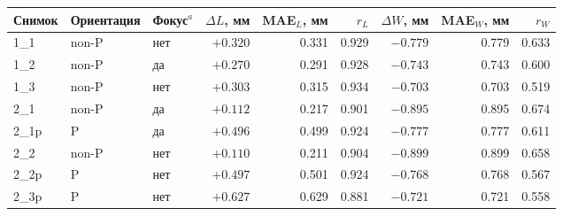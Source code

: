 \begin{tabular}{@{}lllrrrrrr@{}}
\toprule
Снимок & Ориентация & Фокус$^{a}$ & $\Delta L$, мм & MAE$_L$, мм & $r_L$ &
$\Delta W$, мм & MAE$_W$, мм & $r_W$ \\
\midrule
1\_1 & non-P & нет & $+\num{0.320}$ & \num{0.331} & \num{0.929} & $-\num{0.779}$ & \num{0.779} & \num{0.633} \\
1\_2 & non-P & да & $+\num{0.270}$ & \num{0.291} & \num{0.928} & $-\num{0.743}$ & \num{0.743} & \num{0.600} \\
1\_3 & non-P & нет & $+\num{0.303}$ & \num{0.315} & \num{0.934} & $-\num{0.703}$ & \num{0.703} & \num{0.519} \\
2\_1 & non-P & да & $+\num{0.112}$ & \num{0.217} & \num{0.901} & $-\num{0.895}$ & \num{0.895} & \num{0.674} \\
2\_1p & P & да & $+\num{0.496}$ & \num{0.499} & \num{0.924} & $-\num{0.777}$ & \num{0.777} & \num{0.611} \\
2\_2 & non-P & нет & $+\num{0.110}$ & \num{0.211} & \num{0.904} & $-\num{0.899}$ & \num{0.899} & \num{0.658} \\
2\_2p & P & нет & $+\num{0.497}$ & \num{0.501} & \num{0.924} & $-\num{0.768}$ & \num{0.768} & \num{0.567} \\
2\_3p & P & нет & $+\num{0.627}$ & \num{0.629} & \num{0.881} & $-\num{0.721}$ & \num{0.721} & \num{0.558} \\
\bottomrule
\end{tabular}
